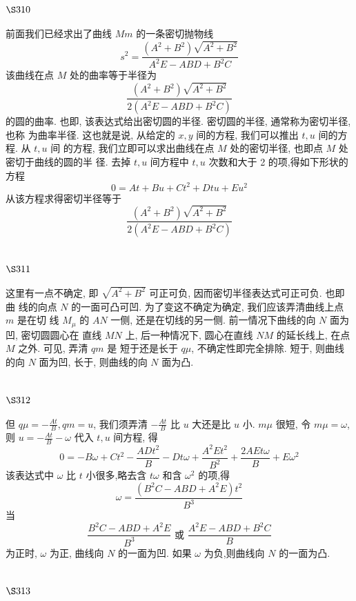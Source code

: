 \section{$\S 310$}

前面我们已经求出了曲线 $M m$ 的一条密切抛物线
\[
s^{2}=\frac{\left(A^{2}+B^{2}\right) \sqrt{A^{2}+B^{2}}}{A^{2} E-A B D+B^{2} C}
\]
该曲线在点 $M$ 处的曲率等于半径为
\[
\frac{\left(A^{2}+B^{2}\right) \sqrt{A^{2}+B^{2}}}{2\left(A^{2} E-A B D+B^{2} C\right)}
\]
的圆的曲率. 也即, 该表达式给出密切圆的半径. 密切圆的半径, 通常称为密切半径, 也称 为曲率半径. 这也就是说, 从给定的 $x, y$ 间的方程, 我们可以推出 $t, u$ 间的方程. 从 $t, u$ 间 的方程, 我们立即可以求出曲线在点 $M$ 处的密切半径, 也即点 $M$ 处密切于曲线的圆的半 径. 去掉 $t, u$ 间方程中 $t, u$ 次数和大于 2 的项,得如下形状的方程
\[
0=A t+B u+C t^{2}+D t u+E u^{2}
\]
从该方程求得密切半径等于
\[
\frac{\left(A^{2}+B^{2}\right) \sqrt{A^{2}+B^{2}}}{2\left(A^{2} E-A B D+B^{2} C\right)}
\]
\section{$\S 311$}

这里有一点不确定, 即 $\sqrt{A^{2}+B^{2}}$ 可正可负, 因而密切半径表达式可正可负. 也即曲 线的向点 $N$ 的一面可凸可凹. 为了变这不确定为确定, 我们应该弄清曲线上点 $m$ 是在切 线 $M_{\mu}$ 的 $A N$ 一侧, 还是在切线的另一侧. 前一情况下曲线的向 $N$ 面为凹, 密切圆圆心在 直线 $M N$ 上, 后一种情况下, 圆心在直线 $N M$ 的延长线上, 在点 $M$ 之外. 可见, 弄清 $q m$ 是 短于还是长于 $q \mu$, 不确定性即完全排除. 短于, 则曲线的向 $N$ 面为凹, 长于, 则曲线的向 $N$ 面为凸. 

\section{$\S 312$}

但 $q \mu=-\frac{A t}{B}, q m=u$, 我们须弄清 $-\frac{A t}{B}$ 比 $u$ 大还是比 $u$ 小. $m \mu$ 很短, 令 $m \mu=\omega$, 则 $u=-\frac{A t}{B}-\omega$ 代入 $t, u$ 间方程, 得
\[
0=-B \omega+C t^{2}-\frac{A D t^{2}}{B}-D t \omega+\frac{A^{2} E t^{2}}{B^{2}}+\frac{2 A E t \omega}{B}+E \omega^{2}
\]
该表达式中 $\omega$ 比 $t$ 小很多,略去含 $t \omega$ 和含 $\omega^{2}$ 的项,得
\[
\omega=\frac{\left(B^{2} C-A B D+A^{2} E\right) t^{2}}{B^{3}}
\]
当
\[
\frac{B^{2} C-A B D+A^{2} E}{B^{3}} \text { 或 } \frac{A^{2} E-A B D+B^{2} C}{B}
\]
为正时, $\omega$ 为正, 曲线向 $N$ 的一面为凹. 如果 $\omega$ 为负,则曲线向 $N$ 的一面为凸.

\section{$\S 313$}

